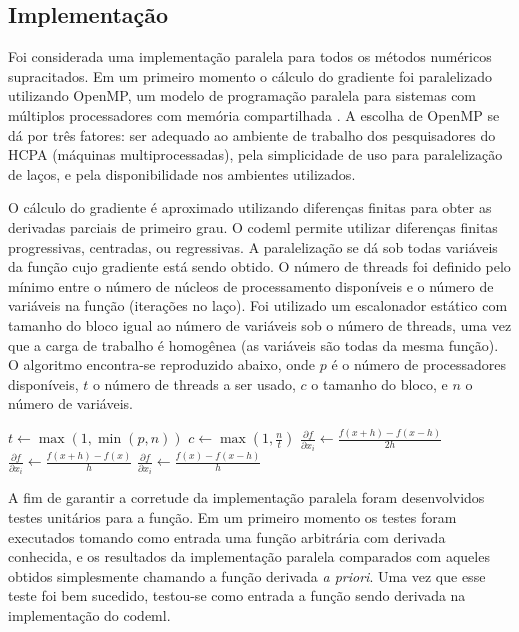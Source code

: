 \documentclass[cic,tc]{iiufrgs}
\begin{document}
\subsection{Implementação}
\label{subsec:codemlpar}

Foi considerada uma implementação paralela para todos os métodos numéricos
supracitados. Em um primeiro momento o cálculo do gradiente foi paralelizado
utilizando OpenMP, um modelo de programação paralela para sistemas com
múltiplos processadores com memória compartilhada \cite{chandra2001parallel}. A
escolha de OpenMP se dá por três fatores: ser adequado ao ambiente de trabalho
dos pesquisadores do HCPA (máquinas multiprocessadas), pela simplicidade de uso
para paralelização de laços, e pela disponibilidade nos ambientes utilizados.

O cálculo do gradiente é aproximado utilizando diferenças finitas para obter as
derivadas parciais de primeiro grau. O codeml permite utilizar diferenças
finitas progressivas, centradas, ou regressivas. A paralelização se dá sob
todas variáveis da função cujo gradiente está sendo obtido. O número de threads
foi definido pelo mínimo entre o número de núcleos de processamento disponíveis
e o número de variáveis na função (iterações no laço). Foi utilizado um
escalonador estático com tamanho do bloco igual ao número de variáveis sob o
número de threads, uma vez que a carga de trabalho é homogênea (as variáveis
são todas da mesma função). O algoritmo encontra-se reproduzido abaixo, onde
$p$ é o número de processadores disponíveis, $t$ o número de threads a ser
usado, $c$ o tamanho do bloco, e $n$ o número de variáveis.

\begin{algorithmic}
\State $t \gets \max(1, \min(p, n))$
\State $c \gets \max(1, \frac{n}{t})$
    \State $\frac{\partial f}{\partial x_i} \gets \frac{f(x+h)-f(x-h)}{2h}$
    \State $\frac{\partial f}{\partial x_i} \gets \frac{f(x+h)-f(x)}{h}$
  \Else
    \State $\frac{\partial f}{\partial x_i} \gets \frac{f(x)-f(x-h)}{h}$
  \EndIf
\EndFor
\end{algorithmic}

A fim de garantir a corretude da implementação paralela foram desenvolvidos
testes unitários para a função. Em um primeiro momento os testes foram
executados tomando como entrada uma função arbitrária com derivada conhecida,
e os resultados da implementação paralela comparados com aqueles obtidos
simplesmente chamando a função derivada \textit{a priori}. Uma vez que esse
teste foi bem sucedido, testou-se como entrada a função sendo derivada na
implementação do codeml.
\end{document}
